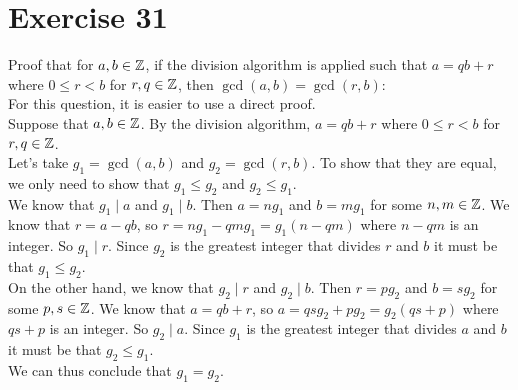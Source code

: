 \documentclass[12pt]{article}
\begin{document}
    \section*{Exercise 31}
    Proof that for $a, b \in \mathbb{Z}$,
    if the division algorithm is applied such that $a = qb + r$
    where $0 \leqslant r < b$ for  $r, q \in \mathbb{Z}$,
    then $\gcd(a, b) = \gcd(r, b)$: \\
    For this question, it is easier to use a direct proof. \\
    Suppose that $a, b \in \mathbb{Z}$.
    By the division algorithm, $a = qb + r$
    where $0 \leqslant r < b$ for  $r, q \in \mathbb{Z}$. \\
    Let's take $g_1 = \gcd(a, b)$ and $g_2 = \gcd(r, b)$.
    To show that they are equal,
    we only need to show that $g_1 \leqslant g_2$
    and $g_2 \leqslant g_1$. \\
    We know that $g_1 \mid a$ and $g_1 \mid b$.
    Then $a = ng_1$ and $b = mg_1$
    for some $n, m \in \mathbb{Z}$.
    We know that $r = a - qb$,
    so $r = ng_1 - qmg_1 = g_1(n - qm)$
    where $n - qm$ is an integer.
    So $g_1 \mid r$.
    Since $g_2$ is the greatest integer that
    divides $r$ and $b$
    it must be that $g_1 \leqslant g_2$. \\
    On the other hand, we know that $g_2 \mid r$ and $g_2 \mid b$.
    Then $r = pg_2$ and $b = sg_2$
    for some $p, s \in \mathbb{Z}$.
    We know that $a = qb + r$,
    so $a = qsg_2 + pg_2 = g_2(qs + p)$
    where $qs + p$ is an integer.
    So $g_2 \mid a$.
    Since $g_1$ is the greatest integer that
    divides $a$ and $b$
    it must be that $g_2 \leqslant g_1$. \\
    We can thus conclude that $g_1 = g_2$. \\
\end{document}
